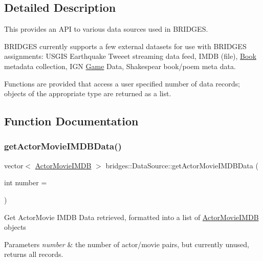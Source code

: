 \subsection{Detailed Description}
This provides an A\+PI to various data sources used in B\+R\+I\+D\+G\+ES. 

B\+R\+I\+D\+G\+ES currently supports a few external datasets for use with B\+R\+I\+D\+G\+ES assignments\+: U\+S\+G\+IS Earthquake Tweeet streaming data feed, I\+M\+DB (file), \mbox{\hyperlink{classbridges_1_1_book}{Book}} metadata collection, I\+GN \mbox{\hyperlink{classbridges_1_1_game}{Game}} Data, Shakespear book/poem meta data.

Functions are provided that access a user specified number of data records; objects of the appropriate type are returned as a list. 

\subsection{Function Documentation}
\mbox{\label{namespacebridges_1_1_data_source_ac43ccd8f2a325cf2f057a5ee7f0b73f1}} 
\subsubsection{\texorpdfstring{get\+Actor\+Movie\+I\+M\+D\+B\+Data()}{getActorMovieIMDBData()}}
{\footnotesize\ttfamily vector$<$ \mbox{\hyperlink{classbridges_1_1_actor_movie_i_m_d_b}{Actor\+Movie\+I\+M\+DB}} $>$ bridges\+::\+Data\+Source\+::get\+Actor\+Movie\+I\+M\+D\+B\+Data (\begin{DoxyParamCaption}\item[{int}]{number = {} }\end{DoxyParamCaption})}

Get Actor\+Movie I\+M\+DB Data retrieved, formatted into a list of \mbox{\hyperlink{classbridges_1_1_actor_movie_i_m_d_b}{Actor\+Movie\+I\+M\+DB}} objects


\begin{DoxyParams}{Parameters}
{\em number} & the number of actor/movie pairs, but currently unused, returns all records. \\
\hline
\end{DoxyParams}

